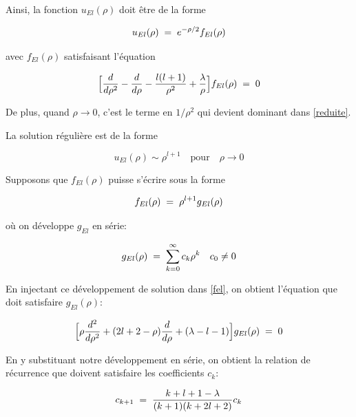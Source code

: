 Ainsi, la fonction $u_{El}(\rho)$ doit être de la forme 

\begin{equation*}
    u_{El}(\rho)\; = \; e^{-\rho/2}f_{El}(\rho)
\end{equation*}

avec $f_{El}(\rho)$ satisfaisant l'équation

\begin{equation}
 \Big[\dfrac{d}{d\rho^2}-\dfrac{d}{d\rho}-\dfrac{l(l+1)}{\rho^2}+\dfrac{\lambda}{\rho}\Big]f_{El}(\rho)\; = \;0
 \label{fel}
\end{equation}

De plus, quand $\rho \longrightarrow 0$, c'est le terme en $1/\rho^2$ qui devient dominant dans \eqref{reduite}. 

\vspace{0.2cm}

La solution régulière est de la forme

\begin{equation*}
    u_{El}(\rho) \sim \rho^{l+1} \quad \text{pour} \quad \rho \longrightarrow 0
\end{equation*}

 Supposons que $f_{El}(\rho)$ puisse s'écrire sous la forme

\begin{equation*}
    f_{El}(\rho)\; = \;\rho^{l+1}g_{El}(\rho)
\end{equation*}

où on développe $g_{El}$ en série:

\begin{equation*}
    g_{El}(\rho)\; = \;\sum_{k=0}^{\infty} c_k\rho^k \quad c_0 \neq 0
\end{equation*}

\vspace{0.2cm}

En injectant ce développement de solution dans \eqref{fel}, on obtient l'équation que doit satisfaire $g_{El}(\rho)$:

\begin{equation}
    \Big[\rho\dfrac{d^2}{d\rho^2}+(2l+2-\rho)\dfrac{d}{d\rho}+(\lambda-l-1)\Big]g_{El}(\rho)\; = \;0
    \label{gel}
\end{equation}

En y substituant notre développement en série, on obtient la relation de récurrence que doivent satisfaire les coefficients $c_k$:

\begin{equation}
    c_{k+1}\; = \;\dfrac{k+l+1-\lambda}{(k+1)(k+2l+2)}c_k
\end{equation}

